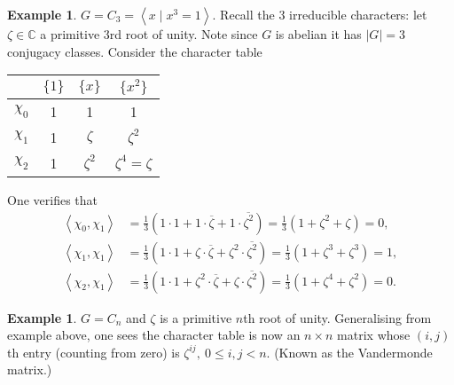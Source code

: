 \documentclass[a4paper]{article}
\newcommand{\la}{\left\langle}
\newcommand{\ra}{\right\rangle}
\newcommand{\C}{\mathbb{C}}
\theoremstyle{definition}
\newtheorem{example}[defn]{Example}
\begin{document}
\begin{example}
$G=C_3=\la x\mid x^3=1\ra$. Recall the 3 irreducible characters: let $\zeta\in\C$ a primitive 3rd root of unity. Note since $G$ is abelian it has $|G|=3$ conjugacy classes. Consider the character table

\begin{table}[H]
\centering
\begin{tabular}{c|ccc}
         & $\{1\}$ & $\{x\}$   & $\{x^2\}$       \\ \hline
$\chi_0$ & 1       & 1         & 1               \\
$\chi_1$ & 1       & $\zeta$   & $\zeta^2$       \\
$\chi_2$ & 1       & $\zeta^2$ & $\zeta^4=\zeta$
\end{tabular}
\end{table}
One verifies that
\[
\begin{aligned}
\la\chi_0,\chi_1\ra&=\frac13\left(1\cdot 1+1\cdot\overline\zeta+1\cdot \overline{\zeta^2}\right)=\frac13\left(1+\zeta^2+\zeta\right)=0,\\
\la\chi_1,\chi_1\ra&=\frac13\left(1\cdot 1+\zeta\cdot\overline\zeta+\zeta^2\cdot\overline{\zeta^2}\right)=\frac13\left(1+\zeta^3+\zeta^3\right)=1,\\
\la\chi_2,\chi_1\ra&=\frac13\left(1\cdot 1+\zeta^2\cdot\overline\zeta+\zeta\cdot \overline{\zeta^2}\right)=\frac13\left(1+\zeta^4+\zeta^2\right)=0.
\end{aligned}
\]
\end{example}

\begin{example}
$G=C_n$ and $\zeta$ is a primitive $n$th root of unity. Generalising from example above, one sees the character table is now an $n\times n$ matrix whose $(i,j)$th entry (counting from zero) is $\zeta^{ij},\ 0\leq i,j<n$. (Known as the Vandermonde matrix.)
\end{example}
\end{document}
